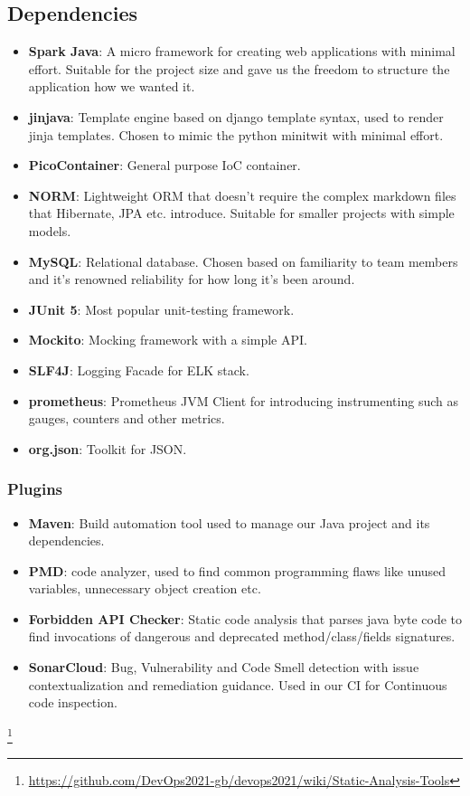 \subsection{Dependencies } %
\begin{itemize}
    \item \textbf{Spark Java}: A micro framework for creating web applications with minimal effort. Suitable for the project size and gave us the freedom to structure the application how we wanted it.
    \item \textbf{jinjava}: Template engine based on django template syntax, used to render jinja templates. Chosen to mimic the python minitwit with minimal effort. 
    \item \textbf{PicoContainer}: General purpose IoC container.
    \item \textbf{NORM}: Lightweight ORM that doesn't require the complex markdown files that Hibernate, JPA etc. introduce. Suitable for smaller projects with simple models. 
    \item \textbf{MySQL}: Relational database. Chosen based on familiarity to team members and it's renowned reliability for how long it's been around.  
    \item \textbf{JUnit 5}: Most popular unit-testing framework.
    \item \textbf{Mockito}: Mocking framework with a simple API.
    \item \textbf{SLF4J}: Logging Facade for ELK stack. 
    \item \textbf{prometheus}: Prometheus JVM Client for introducing instrumenting such as gauges, counters and other metrics.
    \item \textbf{org.json}: Toolkit for JSON.
\end{itemize}
\subsubsection{Plugins}
\begin{itemize}
    \item \textbf{Maven}: Build automation tool used to manage our Java project and its dependencies.
    \item \textbf{PMD}: code analyzer, used to find common programming flaws like unused variables, unnecessary object creation etc. 
    \item \textbf{Forbidden API Checker}: Static code analysis that parses java byte code to find invocations of dangerous and deprecated method/class/fields signatures. 
    \item \textbf{SonarCloud}: Bug, Vulnerability and Code Smell detection with issue contextualization and remediation guidance. Used in our CI for Continuous code inspection.
\end{itemize}
\footnote{\url{https://github.com/DevOps2021-gb/devops2021/wiki/Static-Analysis-Tools}}

